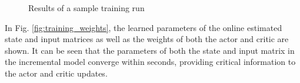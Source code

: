 \begin{figure}[htb!]
    \centering
    \caption{Results of a sample training run}
    \label{fig:training_results}
\end{figure}

In Fig. \ref{fig:training_weights}, the learned parameters of the online estimated state and input matrices as well as the weights of both the actor and critic are shown. It can be seen that the parameters of both the state and input matrix in the incremental model converge within seconds, providing critical information to the actor and critic updates. 

